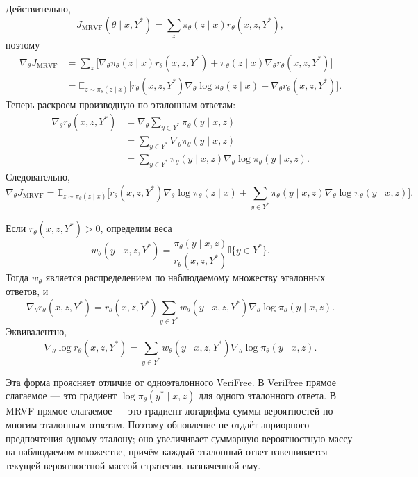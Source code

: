 Действительно,
\[
    J_{\mathrm{MRVF}}(\theta\mid x,Y^{*})
    =
    \sum_z
    \pi_{\theta}(z\mid x)
    r_{\theta}(x,z,Y^{*}),
\]
поэтому
\begin{align*}
    \nabla_{\theta}J_{\mathrm{MRVF}}
     & =
    \sum_z
    \Big[
        \nabla_{\theta}\pi_{\theta}(z\mid x)
        r_{\theta}(x,z,Y^{*})
        +
        \pi_{\theta}(z\mid x)
        \nabla_{\theta}r_{\theta}(x,z,Y^{*})
        \Big]
    \\
     & =
    \mathbb{E}_{z\sim\pi_{\theta}(z\mid x)}
    \Big[
        r_{\theta}(x,z,Y^{*})
        \nabla_{\theta}\log\pi_{\theta}(z\mid x)
        +
        \nabla_{\theta}r_{\theta}(x,z,Y^{*})
        \Big].
\end{align*}
Теперь раскроем производную по эталонным ответам:
\begin{align*}
    \nabla_{\theta}r_{\theta}(x,z,Y^{*})
     & =
    \nabla_{\theta}
    \sum_{y\in Y^{*}}
    \pi_{\theta}(y\mid x,z)
    \\
     & =
    \sum_{y\in Y^{*}}
    \nabla_{\theta}
    \pi_{\theta}(y\mid x,z)
    \\
     & =
    \sum_{y\in Y^{*}}
    \pi_{\theta}(y\mid x,z)
    \nabla_{\theta}
    \log\pi_{\theta}(y\mid x,z).
\end{align*}
Следовательно,
\[
    \nabla_{\theta}J_{\mathrm{MRVF}}
    =
    \mathbb{E}_{z\sim\pi_{\theta}(z\mid x)}
    \Bigg[
        r_{\theta}(x,z,Y^{*})
        \nabla_{\theta}\log\pi_{\theta}(z\mid x)
        +
        \sum_{y\in Y^{*}}
        \pi_{\theta}(y\mid x,z)
        \nabla_{\theta}\log\pi_{\theta}(y\mid x,z)
        \Bigg].
\]

Если \(r_{\theta}(x,z,Y^{*})>0\), определим веса
\[
    w_{\theta}(y\mid x,z,Y^{*})
    =
    \frac{\pi_{\theta}(y\mid x,z)}
    {r_{\theta}(x,z,Y^{*})}
    \mathbb{I}\{y\in Y^{*}\}.
\]
Тогда \(w_{\theta}\) является распределением по наблюдаемому множеству эталонных ответов, и
\[
    \nabla_{\theta}r_{\theta}(x,z,Y^{*})
    =
    r_{\theta}(x,z,Y^{*})
    \sum_{y\in Y^{*}}
    w_{\theta}(y\mid x,z,Y^{*})
    \nabla_{\theta}\log\pi_{\theta}(y\mid x,z).
\]
Эквивалентно,
\[
    \nabla_{\theta}\log r_{\theta}(x,z,Y^{*})
    =
    \sum_{y\in Y^{*}}
    w_{\theta}(y\mid x,z,Y^{*})
    \nabla_{\theta}\log\pi_{\theta}(y\mid x,z).
\]

Эта форма проясняет отличие от одноэталонного VeriFree. В VeriFree прямое слагаемое --- это градиент \(\log\pi_{\theta}(y^{*}\mid x,z)\) для одного эталонного ответа. В MRVF прямое слагаемое --- это градиент логарифма суммы вероятностей по многим эталонным ответам. Поэтому обновление не отдаёт априорного предпочтения одному эталону; оно увеличивает суммарную вероятностную массу на наблюдаемом множестве, причём каждый эталонный ответ взвешивается текущей вероятностной массой стратегии, назначенной ему.

